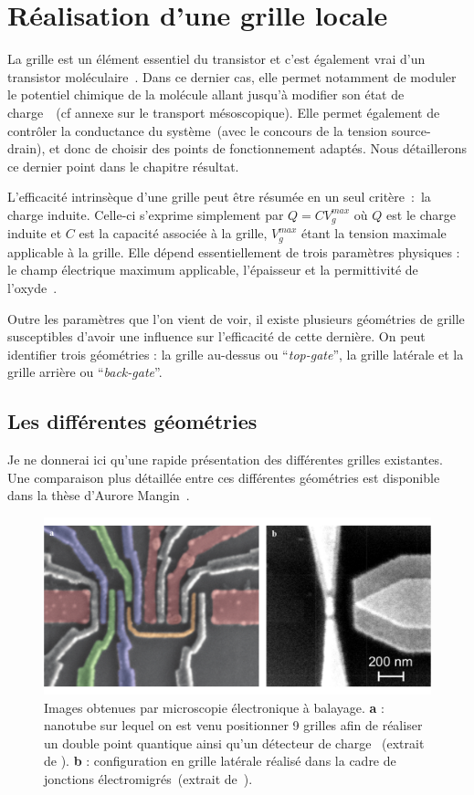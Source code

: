 \section{Réalisation d'une grille locale}
La grille est un élément essentiel du transistor et c'est également vrai d'un transistor moléculaire~\cite{Datta2009,Zant2006}. Dans ce dernier cas, elle permet notamment de moduler le potentiel chimique de la molécule allant jusqu'à modifier son état de charge~\cite{Beenakker1991,Wiel2002,Hanson2007}~(cf annexe sur le transport mésoscopique). Elle permet également de contrôler la conductance du système~(avec le concours de la tension source-drain), et donc de choisir des points de fonctionnement adaptés. Nous détaillerons ce dernier point dans le chapitre résultat. 

L'efficacité intrinsèque d'une grille peut être résumée en un seul critère~:~la charge induite. Celle-ci s'exprime simplement par $Q = CV_g^{max}$ où $Q$ est le charge induite et $C$ est la capacité associée à la grille, $V_g^{max}$ étant la tension maximale applicable à la grille. Elle dépend essentiellement de trois paramètres physiques : le champ électrique maximum applicable, l'épaisseur et la permittivité de l'oxyde~\cite{Biercuk2003}. 

Outre les paramètres que l'on vient de voir, il existe plusieurs géométries de grille susceptibles d'avoir une influence sur l’efficacité de cette dernière. On peut identifier trois géométries : la grille au-dessus ou  ``\textit{top-gate}'', la grille latérale et la grille arrière ou  ``\textit{back-gate}''.

\subsection{Les différentes géométries}
Je ne donnerai ici qu'une rapide présentation des différentes grilles existantes. Une comparaison plus détaillée entre ces différentes géométries est disponible dans la thèse d'Aurore Mangin~\cite{Aurore2009}.

\begin{figure}
\centering \includegraphics[scale=0.45]{Fabrication/Gateconf/GateConf.pdf}
\caption{Images obtenues par microscopie électronique à balayage. \textbf{a} : nanotube sur lequel on est venu positionner 9 grilles afin de réaliser un double point quantique ainsi qu'un détecteur de charge ~(extrait de \cite{Churchill2009}). \textbf{b} : configuration en grille latérale réalisé dans la cadre de jonctions électromigrés~(extrait de~\cite{Aurore2009}).}
\label{GateConf}
\end{figure}


